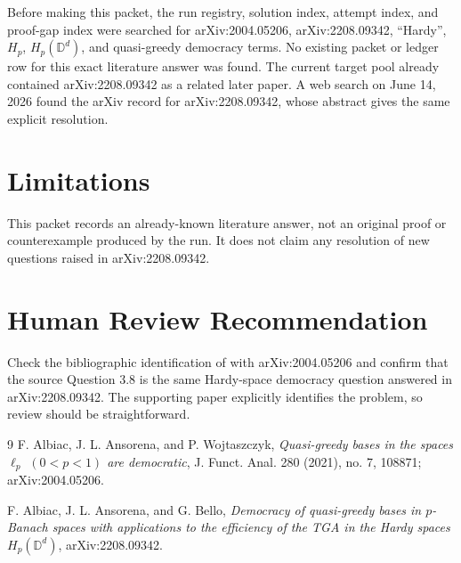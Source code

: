 \documentclass[11pt]{article}
\begin{document}
Before making this packet, the run registry, solution index, attempt index,
and proof-gap index were searched for arXiv:2004.05206, arXiv:2208.09342,
``Hardy'', \(H_p\), \(H_p(\mathbb D^d)\), and quasi-greedy democracy terms.
No existing packet or ledger row for this exact literature answer was found.
The current target pool already contained arXiv:2208.09342 as a related later
paper. A web search on June 14, 2026 found the arXiv record for
arXiv:2208.09342, whose abstract gives the same explicit resolution.

\section*{Limitations}

This packet records an already-known literature answer, not an original proof
or counterexample produced by the run. It does not claim any resolution of
new questions raised in arXiv:2208.09342.

\section*{Human Review Recommendation}

Check the bibliographic identification of \cite{AAW2021} with
arXiv:2004.05206 and confirm that the source Question 3.8 is the same
Hardy-space democracy question answered in arXiv:2208.09342. The supporting
paper explicitly identifies the problem, so review should be straightforward.

\begin{thebibliography}{9}
F. Albiac, J. L. Ansorena, and P. Wojtaszczyk,
\emph{Quasi-greedy bases in the spaces \(\ell_p\) \((0<p<1)\) are democratic},
J. Funct. Anal. 280 (2021), no. 7, 108871; arXiv:2004.05206.

F. Albiac, J. L. Ansorena, and G. Bello,
\emph{Democracy of quasi-greedy bases in \(p\)-Banach spaces with applications
to the efficiency of the TGA in the Hardy spaces \(H_p(\mathbb D^d)\)},
arXiv:2208.09342.
\end{thebibliography}
\end{document}
